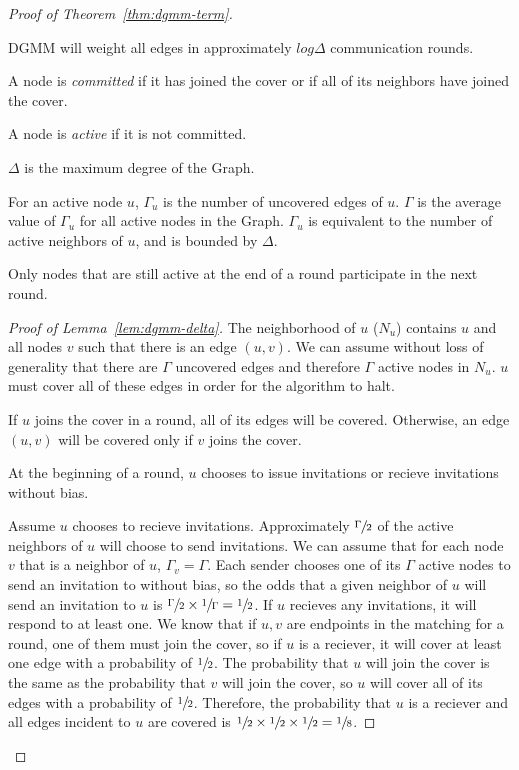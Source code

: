 \begin{proof}[Proof of Theorem~\ref{thm:dgmm-term}]
\begin{lem}
  \label{lem:dgmm-delta}
  DGMM will weight all edges in approximately $log\Delta$ communication rounds.
\end{lem}

\begin{ldef}
A node is {\em committed} if it has joined the cover or if all of its neighbors have joined the cover.
\end{ldef}
\begin{ldef}
A node is {\em active} if it is not committed.
\end{ldef}
\begin{ldef}
$\Delta$ is the maximum degree of the Graph.
\end{ldef}
\begin{ldef}
\label{def:gamma}
For an active node $u$, $\Gamma_u$ is the number of uncovered edges of $u$. $\Gamma$ is the average value of $\Gamma_u$ for all active nodes in the Graph. $\Gamma_u$ is equivalent to the number of active neighbors of $u$, and is bounded by $\Delta$.
\end{ldef}
\begin{note}
Only nodes that are still active at the end of a round participate in the next round. 
\end{note}
 
\begin{proof}[Proof of Lemma~\ref{lem:dgmm-delta}]
The neighborhood of $u$ ($N_u$) contains $u$ and all nodes $v$ such that there is an edge $(u,v)$. We can assume without loss of generality that there are $\Gamma$ uncovered edges and therefore $\Gamma$ active nodes in $N_u$. $u$ must cover all of these edges in order for the algorithm to halt. 

If $u$ joins the cover in a round, all of its edges will be covered. Otherwise, an edge $(u,v)$ will be covered only if $v$ joins the cover.

At the beginning of a round, $u$ chooses to issue invitations or recieve invitations without bias.

Assume $u$ chooses to recieve invitations. Approximately $\sfrac{\Gamma}{2}$ of the active neighbors of $u$ will choose to send invitations. We can assume that for each node $v$ that is a neighbor of $u$, $\Gamma_v = \Gamma$. Each sender chooses one of its $\Gamma$ active nodes to send an invitation to without bias, so the odds that a given neighbor of $u$ will send an invitation to $u$ is $\sfrac{\Gamma}{2} \times \sfrac{1}{\Gamma} = \sfrac{1}{2}$. If $u$ recieves any invitations, it will respond to at least one. We know that if $u,v$ are endpoints in the matching for a round, one of them must join the cover, so if $u$ is a reciever, it will cover at least one edge with a probability of $\sfrac{1}{2}$. The probability that $u$ will join the cover is the same as the probability that $v$ will join the cover, so $u$ will cover all of its edges with a probability of $\sfrac{1}{2}$. Therefore, the probability that $u$ is a reciever and all edges incident to $u$ are covered is $\sfrac{1}{2} \times \sfrac{1}{2} \times \sfrac{1}{2} = \sfrac{1}{8}$.


\end{proof}
\end{proof}
